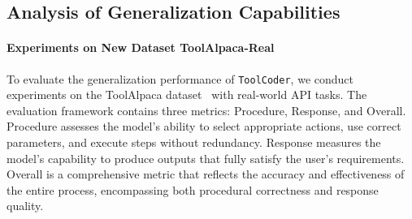 \begin{table}[t]
\centering
{}
\caption{Performance comparison of different models on real-world API tasks using the ToolAlpaca dataset. Metrics include Procedure, Response, and Overall scores. All methods are implemented with \textit{gpt-4o-mini}. Due to the small number of questions under each tool category, we do not use the reusability mechanism on this dataset.}
\label{tab:toolalpaca}
\vspace{-0.3cm}
\end{table}

\subsection{Analysis of Generalization Capabilities}
\paragraph{Experiments on New Dataset ToolAlpaca-Real}
To evaluate the generalization performance of \texttt{ToolCoder}, we conduct experiments on the ToolAlpaca dataset~\cite{DBLP:journals/corr/abs-2306-05301} with real-world API tasks. The evaluation framework contains three metrics: Procedure, Response, and Overall. Procedure assesses the model's ability to select appropriate actions, use correct parameters, and execute steps without redundancy. Response measures the model's capability to produce outputs that fully satisfy the user's requirements. Overall is a comprehensive metric that reflects the accuracy and effectiveness of the entire process, encompassing both procedural correctness and response quality.

